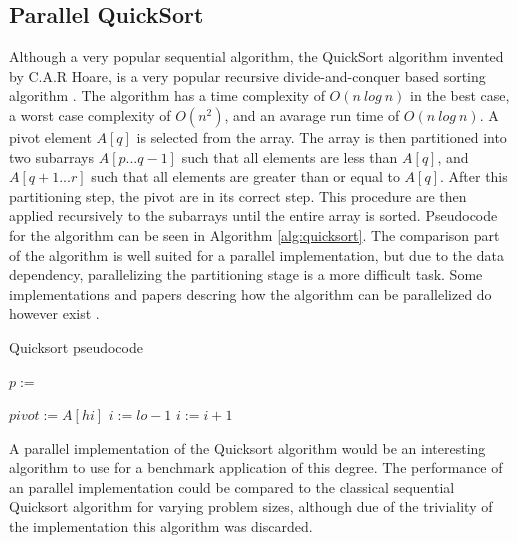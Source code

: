 \subsection{Parallel QuickSort}
Although a very popular sequential algorithm, the QuickSort algorithm invented by C.A.R  Hoare, is a very popular recursive divide-and-conquer based sorting algorithm \cite{hoare1962quicksort}. The algorithm has a time complexity of $O(n \ log \ n)$ in the best case, a worst case complexity of $O(n^2)$, and an avarage run time of $O(n \ log \ n)$. A pivot element $A[q]$ is selected from the array. The array is then partitioned into two subarrays $A[p...q-1]$ such that all elements are less than $A[q]$, and $A[q+1...r]$ such that all elements are greater than or equal to $A[q]$. After this partitioning step, the pivot are in its correct step. This procedure are then applied recursively to the subarrays until the entire array is sorted. Pseudocode for the algorithm can be seen in Algorithm \ref{alg:quicksort}. The comparison part of the algorithm is well suited for a parallel implementation, but due to the data dependency, parallelizing the partitioning stage is a more difficult task. Some implementations and papers descring how the algorithm can be parallelized do however exist \cite{cederman2009gpu}\cite{sanders1997efficient}\cite{chen2009fast}.

\begin{algorithm}
    \caption{Quicksort pseudocode}
    \label{alg:quicksort}
    \begin{algorithmic}[1]
                \State $p:=$ 
            	\State {}
            	\State {}
            \EndIf
        \EndProcedure
        
            \State $pivot := A[hi]$
            \State $i := lo - 1$
                    \State $i := i + 1$
                    \State {}
                \EndIf
            \EndFor
                \State {}
            \EndIf
        \EndProcedure
    \end{algorithmic}
\end{algorithm}

A parallel implementation of the Quicksort algorithm would be an interesting algorithm to use for a benchmark application of this degree. The performance of an parallel implementation could be compared to the classical sequential Quicksort algorithm for varying problem sizes, although due of the triviality of the implementation this algorithm was discarded.

